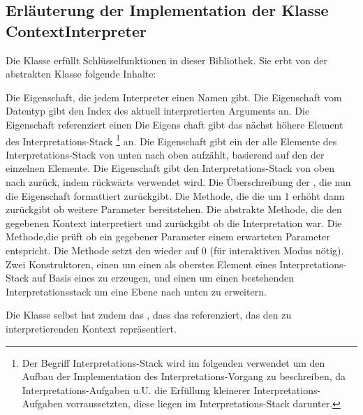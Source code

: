 \subsection{Erläuterung der Implementation der Klasse ContextInterpreter}\label{subsec:ContextInterpreter}
Die Klasse  erfüllt Schlüsselfunktionen in dieser Bibliothek.
Sie erbt von der abstrakten  Klasse folgende Inhalte:
\begin{outline}
 \1 Die  Eigenschaft, die jedem Interpreter einen Namen gibt.
 \1 Die  Eigenschaft vom Datentyp  gibt den Index des aktuell interpretierten Arguments an.
 \1 Die  Eigenschaft referenziert einen 
 \1 Die  Eigens chaft gibt das nächst höhere Element des Interpretations-Stack
 \footnote{Der Begriff Interpretations-Stack wird im folgenden verwendet um den Aufbau der Implementation des Interpretations-Vorgang zu beschreiben, da Interpretations-Aufgaben u.U. die Erfüllung kleinerer Interpretations-Aufgaben vorraussetzten, diese liegen im Interpretations-Stack darunter.}
 an.%
 \1 Die  Eigenschaft gibt ein  der alle Elemente des Interpretations-Stack von unten nach oben aufzählt, basierend auf den  der einzelnen Elemente.
 \1 Die  Eigenschaft gibt den Interpretations-Stack von oben nach zurück, indem  rückwärts verwendet wird.
 \1 Die Überschreibung der , die nun die  Eigenschaft formattiert zurückgibt.
 \1 Die  Methode, die die  um 1 erhöht dann zurückgibt ob weitere Parameter bereitstehen.
 \1 Die abstrakte  Methode, die den gegebenen Kontext interpretiert und zurückgibt ob die Interpretation war.
 \1 Die  Methode,die prüft ob ein gegebener Parameter einem erwarteten Parameter entspricht.
 \1 Die  Methode setzt den  wieder auf 0 (für interaktiven Modus nötig).
 \1 Zwei Konstruktoren, einen um einen  als oberstes Element eines Interpretations-Stack auf Basis eines  zu erzeugen, und einen um einen bestehenden Interpretationsstack um eine Ebene nach unten zu erweitern.
\end{outline}
Die  Klasse selbst hat zudem das , dass das  referenziert, das den zu interpretierenden Kontext repräsentiert.
